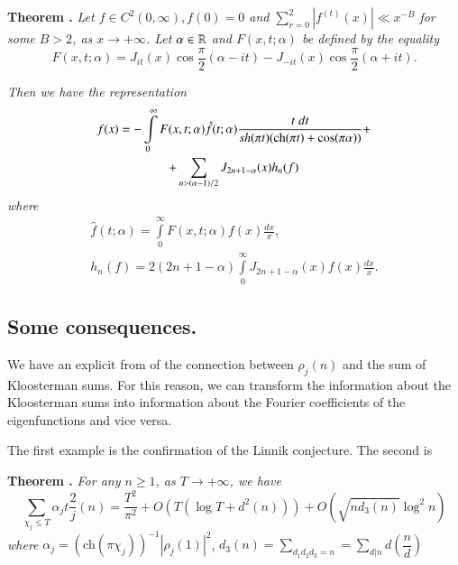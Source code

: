 \medskip
\noindent
{\bfseries Theorem .\label{art7-thm5}}%
\textit{Let $f\in C^2 (0, \infty), f (0) = 0$ and $\sum\limits^2_{r=0} |f^{(t)} (x)| \ll x^{-B}$ for some $B>2$, as $x \to + \infty$. Let $\alpha \in \mathbb{R}$ and $F(x,t;\alpha)$ be defined by the equality} 
\begin{equation}
F(x, t; \alpha) = J_{it} (x) \cos \frac{\pi}{2} (\alpha - it) - J_{-it}  (x) \cos \frac{\pi}{2} (\alpha + it) . \label{art7-eq1.38}
\end{equation}

\textit{Then we have the representation}
\begin{gather}
f(x) = - \int\limits^\infty_0 F(x, t; \alpha) \hat{f} (t;\alpha) \frac{t \; dt}{ sh (\pi t) (\text{ch}(\pi t) + \cos (\pi \alpha))} +\label{art7-eq1.39}\\
+ \sum\limits_{n>(\alpha -1) /2} J_{2n + 1-\alpha} (x) h_n (f) \notag
\end{gather}
\textit{where }
\begin{gather}
\hat{f} (t;\alpha) = \int\limits^\infty_0 F(x, t; \alpha) f(x) \frac{dx}{x}, \label{art7-eq1.40}\\
h_n(f) = 2 (2n+1-\alpha) \int\limits^\infty_0 J_{2n +1 -\alpha}  (x) f (x) \frac{dx}{x} .
\label{art7-eq1.41}
\end{gather}

\subsection{Some consequences.}\label{art7-subsec1.7}
We have an explicit from of the connection between $\rho_j(n)$ and the sum of Kloosterman sums. For this reason, we can transform the information about the Kloosterman sums into information about the Fourier coefficients of the eigenfunctions and vice versa.

The first example is the confirmation of the Linnik conjecture. The second is 

\noindent
{\bfseries Theorem .\label{art7-thm6}} \textit{For any $n\geqslant 1$, as $T \to + \infty$, we have}
\begin{equation}
\sum\limits_{\chi_j \leqslant T} \alpha_j t \frac{2}{j} (n) = \frac{T^2}{\pi^2} + O(T (\log T + d^2 (n))) + O(\sqrt{nd_3 (n)} \log^2 n)  \label{art7-eq1.42}
\end{equation}
\textit{where} $\alpha_j = (\text{ch}(\pi \chi_j))^{-1} |\rho_j(1)|^2$, $d_3 (n) = \sum\limits_{d_1 d_2 d_3 = n} = \sum\limits_{d|n} d \left(\dfrac{n}{d} \right)$

